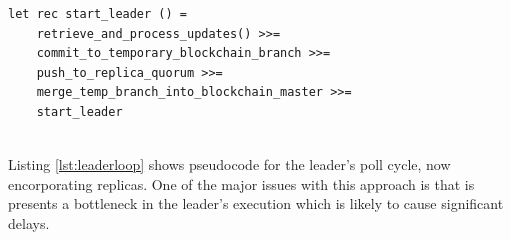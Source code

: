 \documentclass[12pt,a4paper,twoside,openright]{report}
\begin{document}
	\begin{minipage}{\linewidth} 
	\begin{lstlisting}[caption={Naive Leader Loop},label={lst:leaderloop}]
let rec start_leader () = 
	retrieve_and_process_updates() >>= 
	commit_to_temporary_blockchain_branch >>=
	push_to_replica_quorum >>=
	merge_temp_branch_into_blockchain_master >>=
	start_leader
	\end{lstlisting}
	\end{minipage}
	\\

	Listing \ref{lst:leaderloop} shows pseudocode for the leader's poll cycle, now encorporating replicas. 
	One of the major issues with this approach is that is presents a bottleneck in the leader's execution which is likely to cause significant delays.\\
\end{document}
